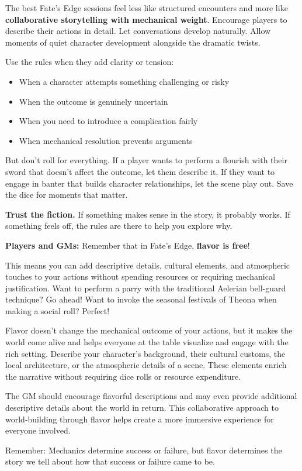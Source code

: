 The best Fate's Edge sessions feel less like structured encounters and more like \textbf{collaborative storytelling with mechanical weight}. Encourage players to describe their actions in detail. Let conversations develop naturally. Allow moments of quiet character development alongside the dramatic twists.

Use the rules when they add clarity or tension:
\begin{itemize}
    \item When a character attempts something challenging or risky
    \item When the outcome is genuinely uncertain
    \item When you need to introduce a complication fairly
    \item When mechanical resolution prevents arguments
\end{itemize}

But don't roll for everything. If a player wants to perform a flourish with their sword that doesn't affect the outcome, let them describe it. If they want to engage in banter that builds character relationships, let the scene play out. Save the dice for moments that matter.

\textbf{Trust the fiction.} If something makes sense in the story, it probably works. If something feels off, the rules are there to help you explore why.

\begin{tcolorbox}[enhanced, sharp corners, boxrule=1pt, colback=gray!5!white, colframe=gray!75!black, title={Flavor is Free}]
\textbf{Players and GMs:} Remember that in Fate's Edge, \textbf{flavor is free}!

This means you can add descriptive details, cultural elements, and atmospheric touches to your actions without spending resources or requiring mechanical justification. Want to perform a parry with the traditional Aelerian bell-guard technique? Go ahead! Want to invoke the seasonal festivals of Theona when making a social roll? Perfect!

Flavor doesn't change the mechanical outcome of your actions, but it makes the world come alive and helps everyone at the table visualize and engage with the rich setting. Describe your character's background, their cultural customs, the local architecture, or the atmospheric details of a scene. These elements enrich the narrative without requiring dice rolls or resource expenditure.

The GM should encourage flavorful descriptions and may even provide additional descriptive details about the world in return. This collaborative approach to world-building through flavor helps create a more immersive experience for everyone involved.

Remember: Mechanics determine success or failure, but flavor determines the story we tell about how that success or failure came to be.
\end{tcolorbox}


